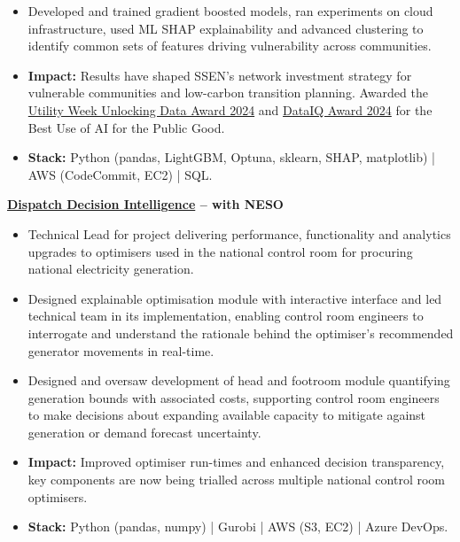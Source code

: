 \documentclass{my_cv}
\begin{document}
{\begin{itemize}[topsep=0pt,itemsep=0pt,partopsep=0pt,parsep=0pt]
    \item Developed and trained gradient boosted models, ran experiments on cloud infrastructure, used ML SHAP explainability and advanced clustering to identify common sets of features driving vulnerability across communities.
    \item \textbf{Impact:} Results have shaped SSEN's network investment strategy for vulnerable communities and low-carbon transition planning. Awarded the \href{https://www.ssen.co.uk/news-views/2024/SSENs-innovative-net-Zero-programmes-win-big-at-the-2024-Utility-Week-awards/}{Utility Week Unlocking Data Award 2024} and \href{https://www.dataiq.global/award-winner/2024-dataiq-awards-best-use-of-ai-for-the-public-good/}{DataIQ Award 2024} for the Best Use of AI for the Public Good.
    \item \textbf{Stack:} Python (pandas, LightGBM, Optuna, sklearn, SHAP, matplotlib) | AWS (CodeCommit, EC2) | SQL.
\end{itemize}
\textbf{\href{https://www.smithinst.co.uk/case-studies/modernising-optimisation-algorithms-for-the-control-room/}{Dispatch Decision Intelligence} – with NESO}
\begin{itemize}[topsep=0pt,itemsep=0pt,partopsep=0pt,parsep=0pt]
	\item Technical Lead for project delivering performance, functionality and analytics upgrades to optimisers used in the national control room for procuring national electricity generation.
    \item Designed explainable optimisation module with interactive interface and led technical team in its implementation, enabling control room engineers to interrogate and understand the rationale behind the optimiser's recommended generator movements in real-time.
\item Designed and oversaw development of head and footroom module quantifying generation bounds with associated costs, supporting control room engineers to make decisions about expanding available capacity to mitigate against generation or demand forecast uncertainty.
\item \textbf{Impact:} Improved optimiser run-times and enhanced decision transparency, key components are now being trialled across multiple national control room optimisers.
\item \textbf{Stack:} Python (pandas, numpy) | Gurobi | AWS (S3, EC2) | Azure DevOps. \\
\\
\end{itemize}
}
\end{document}
